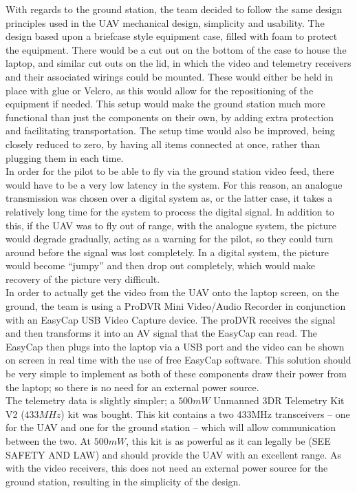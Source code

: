 \documentclass[12pt]{article}
\begin{document}
\noindent With regards to the ground station, the team decided to follow the same design principles used in the UAV mechanical design, simplicity and usability. The design based upon a briefcase style equipment case, filled with foam to protect the equipment. There would be a cut out on the bottom of the case to house the laptop, and similar cut outs on the lid, in which the video and telemetry receivers and their associated wirings could be mounted. These would either be held in place with glue or Velcro, as this would allow for the repositioning of the equipment if needed. This setup would make the ground station much more functional than just the components on their own, by adding extra protection and facilitating transportation. The setup time would also be improved, being closely reduced to zero, by having all items connected at once, rather than plugging them in each time. \\

\noindent In order for the pilot to be able to fly via the ground station video feed, there would have to be a very low latency in the system. For this reason, an analogue transmission was chosen over a digital system as, or the latter case, it takes a relatively long time for the system to process the digital signal. In addition to this, if the UAV was to fly out of range, with the analogue system, the picture would degrade gradually, acting as a warning for the pilot, so they could turn around before the signal was lost completely. In a digital system, the picture would become “jumpy” and then drop out completely, which would make recovery of the picture very difficult. \\

\noindent In order to actually get the video from the UAV onto the laptop screen, on the ground, the team is using a ProDVR Mini Video/Audio Recorder in conjunction with an EasyCap USB Video Capture device. The proDVR receives the signal and then transforms it into an AV signal that the EasyCap can read. The EasyCap then plugs into the laptop via a USB port and the video can be shown on screen in real time with the use of free EasyCap software. This solution should be very simple to implement as both of these components draw their power from the laptop; so there is no need for an external power source. \\

\noindent The telemetry data is slightly simpler; a $500mW$ Unmanned 3DR Telemetry Kit V2 ($433MHz$) kit was bought. This kit contains a two 433MHz transceivers – one for the UAV and one for the ground station – which will allow communication between the two. At $500mW$, this kit is as powerful as it can legally be (SEE SAFETY AND LAW) and should provide the UAV with an excellent range. As with the video receivers, this does not need an external power source for the ground station, resulting in the simplicity of the design. \\
\end{document}
